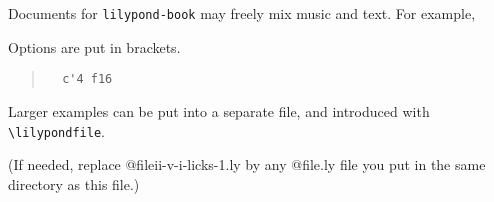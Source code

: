 \documentclass[letter]{article}
\begin{document}
Documents for \verb+lilypond-book+ may freely mix music and text.
For example,

{%
\parindent 0pt
\noindent
\ifx\preLilyPondExample \undefined
\else
  \expandafter\preLilyPondExample
\fi
\def\lilypondbook{}%

\ifx\postLilyPondExample \undefined
\else
  \expandafter\postLilyPondExample
\fi
}

Options are put in brackets.

\begin{quote}
\noindent
\begin{verbatim}
  c'4 f16
\end{verbatim}
{%
\parindent 0pt
\noindent
\ifx\preLilyPondExample \undefined
\else
  \expandafter\preLilyPondExample
\fi
\def\lilypondbook{}%

\ifx\postLilyPondExample \undefined
\else
  \expandafter\postLilyPondExample
\fi
}
\end{quote}

Larger examples can be put into a separate file, and introduced with
\verb+\lilypondfile+.

\begin{quote}
{%
\parindent 0pt
\noindent
\ifx\preLilyPondExample \undefined
\else
  \expandafter\preLilyPondExample
\fi
\def\lilypondbook{}%

\ifx\postLilyPondExample \undefined
\else
  \expandafter\postLilyPondExample
\fi
}
\end{quote}

(If needed, replace @file{ii-v-i-licks-1.ly} by any @file{.ly} file
you put in the same directory as this file.)
\end{document}
